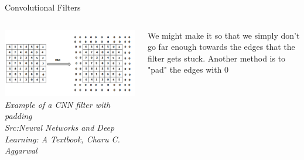\begin{frame}{Convolutional Filters}
	\begin{columns}[T]
        \begin{column}{0.5\textwidth}
        	\includegraphics[width=\textwidth]{images/CNN_filter_pad.png}
			\tiny{\textit{Example of a CNN filter with padding\\Src:Neural Networks and Deep Learning: A Textbook, Charu C. Aggarwal }}
        \end{column}
		\begin{column}{0.5\textwidth}
			We might make it so that we simply don't go far enough towards the edges that the filter gets stuck. Another method is to "pad" the edges with 0 
		\end{column} 
    \end{columns}
\end{frame}

